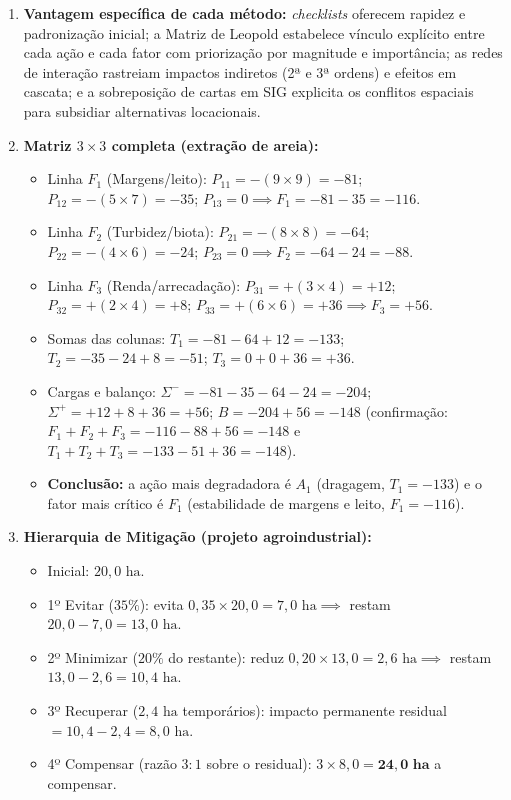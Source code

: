 \begin{boxGabarito}
\begin{enumerate}[leftmargin=1.8em, itemsep=4pt]
    \item \textbf{Vantagem específica de cada método:} \textit{checklists} oferecem rapidez e padronização inicial; a Matriz de Leopold estabelece vínculo explícito entre cada ação e cada fator com priorização por magnitude e importância; as redes de interação rastreiam impactos indiretos (2ª e 3ª ordens) e efeitos em cascata; e a sobreposição de cartas em SIG explicita os conflitos espaciais para subsidiar alternativas locacionais.

    \item \textbf{Matriz $3 \times 3$ completa (extração de areia):}
    \begin{itemize}[leftmargin=1.4em, itemsep=1pt]
      \item Linha $F_1$ (Margens/leito): $P_{11} = -(9 \times 9) = -81$; $P_{12} = -(5 \times 7) = -35$; $P_{13} = 0 \implies F_1 = -81 - 35 = -116$.
      \item Linha $F_2$ (Turbidez/biota): $P_{21} = -(8 \times 8) = -64$; $P_{22} = -(4 \times 6) = -24$; $P_{23} = 0 \implies F_2 = -64 - 24 = -88$.
      \item Linha $F_3$ (Renda/arrecadação): $P_{31} = +(3 \times 4) = +12$; $P_{32} = +(2 \times 4) = +8$; $P_{33} = +(6 \times 6) = +36 \implies F_3 = +56$.
      \item Somas das colunas: $T_1 = -81 - 64 + 12 = -133$; $T_2 = -35 - 24 + 8 = -51$; $T_3 = 0 + 0 + 36 = +36$.
      \item Cargas e balanço: $\Sigma^{-} = -81 - 35 - 64 - 24 = -204$; $\Sigma^{+} = +12 + 8 + 36 = +56$; $B = -204 + 56 = -148$ (confirmação: $F_1+F_2+F_3 = -116 - 88 + 56 = -148$ e $T_1+T_2+T_3 = -133 - 51 + 36 = -148$).
      \item \textbf{Conclusão:} a ação mais degradadora é $A_1$ (dragagem, $T_1 = -133$) e o fator mais crítico é $F_1$ (estabilidade de margens e leito, $F_1 = -116$).
    \end{itemize}

    \item \textbf{Hierarquia de Mitigação (projeto agroindustrial):}
    \begin{itemize}[leftmargin=1.4em, itemsep=1pt]
      \item Inicial: $20{,}0\text{ ha}$.
      \item 1º Evitar ($35\%$): evita $0{,}35 \times 20{,}0 = 7{,}0\text{ ha} \implies$ restam $20{,}0 - 7{,}0 = 13{,}0\text{ ha}$.
      \item 2º Minimizar ($20\%$ do restante): reduz $0{,}20 \times 13{,}0 = 2{,}6\text{ ha} \implies$ restam $13{,}0 - 2{,}6 = 10{,}4\text{ ha}$.
      \item 3º Recuperar ($2{,}4\text{ ha}$ temporários): impacto permanente residual $= 10{,}4 - 2{,}4 = 8{,}0\text{ ha}$.
      \item 4º Compensar (razão $3{:}1$ sobre o residual): $3 \times 8{,}0 = \mathbf{24{,}0\text{ ha}}$ a compensar.
    \end{itemize}


\end{enumerate}
\end{boxGabarito}
